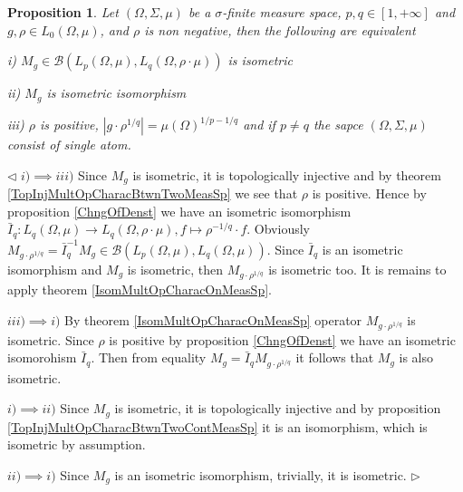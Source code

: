 \documentclass[12pt]{article}
\newtheorem{proposition}[theorem]{Proposition}
\newenvironment{proof}{\par $\triangleleft$}{$\triangleright$}
\begin{document}
\begin{proposition}\label{IsomMultOpCharacBtwnTwoContMeasSp} Let $(\Omega,\Sigma,\mu)$ be a $\sigma$-finite measure space, $p,q\in[1,+\infty]$ and $g,\rho\in L_0(\Omega,\mu)$, and $\rho$ is non negative, then the following are equivalent

i) $M_g\in\mathcal{B}(L_p(\Omega,\mu), L_q(\Omega,\rho\cdot\mu))$ is isometric

ii) $M_g$ is isometric isomorphism

iii) $\rho$ is positive, $|g\cdot \rho^{1/q}|=\mu(\Omega)^{1/p-1/q}$ and if $p\neq q$ the sapce $(\Omega,\Sigma,\mu)$ consist of single atom.
\end{proposition}
\begin{proof} $i)\implies iii)$ Since $M_g$ is isometric, it is topologically injective and by theorem \ref{TopInjMultOpCharacBtwnTwoMeasSp} we see that $\rho$ is positive. Hence by proposition \ref{ChngOfDenst} we have an isometric isomorphism $\bar{I}_q:L_q(\Omega,\mu)\to L_q(\Omega,\rho\cdot\mu),f\mapsto \rho^{-1/q}\cdot f$. Obviously $M_{g\cdot\rho^{1/q}}=\bar{I}_q^{-1} M_g\in\mathcal{B}(L_p(\Omega,\mu),L_q(\Omega,\mu))$. Since $\bar{I}_q$ is an isometric isomorphism and $M_g$ is isometric, then $M_{g\cdot \rho^{1/q}}$ is isometric too. It is remains to apply theorem \ref{IsomMultOpCharacOnMeasSp}.

$iii)\implies i)$ By theorem \ref{IsomMultOpCharacOnMeasSp} operator $M_{g\cdot\rho^{1/q}}$ is isometric. Since $\rho$ is positive by proposition \ref{ChngOfDenst} we have an isometric isomorohism $\bar{I}_q$. Then from equality $M_g=\bar{I}_q M_{g\cdot\rho^{1/q}}$ it follows that $M_g$ is also isometric.

$i)\implies ii)$ Since $M_g$ is isometric, it is topologically injective and by proposition \ref{TopInjMultOpCharacBtwnTwoContMeasSp} it is an isomorphism, which is isometric by assumption.

$ii)\implies i)$ Since $M_g$ is an isometric isomorphism, trivially, it is isometric.
\end{proof}
\end{document}
